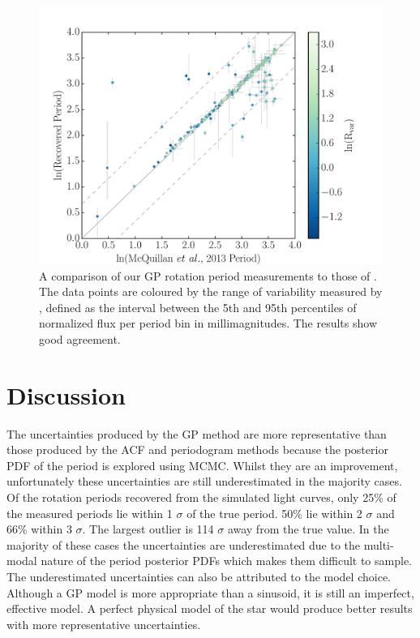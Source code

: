 \documentclass[useAMS, usenatbib, preprint, 12pt]{aastex}
\begin{document}
\begin{figure}
\begin{center}
\includegraphics[width=6in, clip=true]{figures/comparison_koi.pdf}
\caption[Comparison with McQuillan results.]
{A comparison of our GP rotation period measurements to those of
\citet{Mcquillan2014}.
The data points are coloured by the range of variability measured by
    \citet{Mcquillan2014}, defined as the interval between the 5th and 95th
    percentiles of normalized flux per period bin in millimagnitudes.
    The results show good agreement.}
\label{fig:mcquillan}
\end{center}
\end{figure}

\section{Discussion}
\label{sec:discussion}

The uncertainties produced by the GP method are more representative than those
produced by the ACF and periodogram methods because the posterior PDF of the
period is explored using MCMC.
Whilst they are an improvement, unfortunately these uncertainties are still
underestimated in the majority cases.
Of the rotation periods recovered from the simulated light curves, only 25\%
of the measured periods lie within 1 $\sigma$ of the true period.
50\% lie within 2 $\sigma$ and 66\% within 3 $\sigma$.
The largest outlier is 114 $\sigma$ away from the true value.
In the majority of these cases the uncertainties are underestimated due to the
multi-modal nature of the period posterior PDFs which makes them difficult to
sample.
The underestimated uncertainties can also be attributed to the model choice.
Although a GP model is more appropriate than a sinusoid, it is still an
imperfect, effective model.
A perfect physical model of the star would produce better results with more
representative uncertainties.
\end{document}
